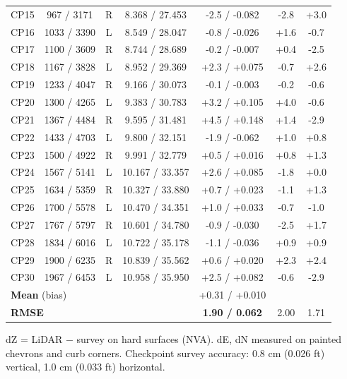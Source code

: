 {\begin{longtable}{lcccccc}
CP15 & 967 / 3171 & R & 8.368 / 27.453 & -2.5 / -0.082 & -2.8 & +3.0\\
CP16 & 1033 / 3390 & L & 8.549 / 28.047 & -0.8 / -0.026 & +1.6 & -0.7\\
CP17 & 1100 / 3609 & R & 8.744 / 28.689 & -0.2 / -0.007 & +0.4 & -2.5\\
CP18 & 1167 / 3828 & L & 8.952 / 29.369 & +2.3 / +0.075 & -0.7 & +2.6\\
CP19 & 1233 / 4047 & R & 9.166 / 30.073 & -0.1 / -0.003 & -0.2 & -0.6\\
CP20 & 1300 / 4265 & L & 9.383 / 30.783 & +3.2 / +0.105 & +4.0 & -0.6\\
CP21 & 1367 / 4484 & R & 9.595 / 31.481 & +4.5 / +0.148 & +1.4 & -2.9\\
CP22 & 1433 / 4703 & L & 9.800 / 32.151 & -1.9 / -0.062 & +1.0 & +0.8\\
CP23 & 1500 / 4922 & R & 9.991 / 32.779 & +0.5 / +0.016 & +0.8 & +1.3\\
CP24 & 1567 / 5141 & L & 10.167 / 33.357 & +2.6 / +0.085 & -1.8 & +0.0\\
CP25 & 1634 / 5359 & R & 10.327 / 33.880 & +0.7 / +0.023 & -1.1 & +1.3\\
CP26 & 1700 / 5578 & L & 10.470 / 34.351 & +1.0 / +0.033 & -0.7 & -1.0\\
CP27 & 1767 / 5797 & R & 10.601 / 34.780 & -0.9 / -0.030 & -2.5 & +1.7\\
CP28 & 1834 / 6016 & L & 10.722 / 35.178 & -1.1 / -0.036 & +0.9 & +0.9\\
CP29 & 1900 / 6235 & R & 10.839 / 35.562 & +0.6 / +0.020 & +2.3 & +2.4\\
CP30 & 1967 / 6453 & L & 10.958 / 35.950 & +2.5 / +0.082 & -0.6 & -2.9\\
\midrule
\multicolumn{4}{l}{\textbf{Mean} (bias)} & +0.31 / +0.010 & & \\
\multicolumn{4}{l}{\textbf{RMSE}} & \textbf{1.90 / 0.062} & 2.00 & 1.71\\\bottomrule
\end{longtable}}
{\footnotesize dZ = LiDAR $-$ survey on hard surfaces (NVA). dE, dN measured on painted chevrons and curb corners. Checkpoint survey accuracy: 0.8 cm (0.026 ft) vertical, 1.0 cm (0.033 ft) horizontal.}


